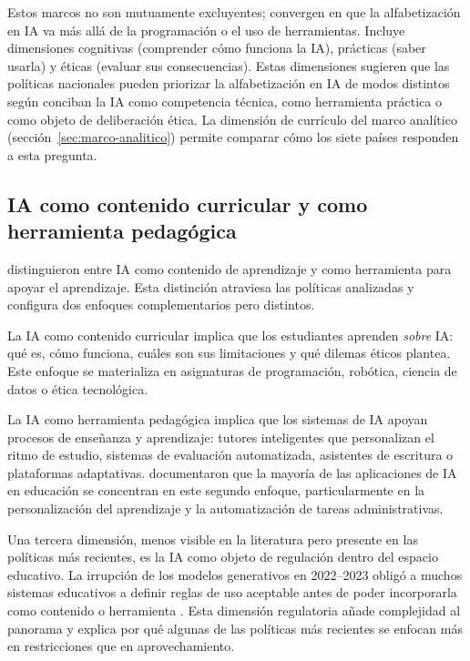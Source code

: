 Estos marcos no son mutuamente excluyentes; convergen en que la alfabetización en IA va más allá de la programación o el uso de herramientas. Incluye dimensiones cognitivas (comprender cómo funciona la IA), prácticas (saber usarla) y éticas (evaluar sus consecuencias). Estas dimensiones sugieren que las políticas nacionales pueden priorizar la alfabetización en IA de modos distintos según conciban la IA como competencia técnica, como herramienta práctica o como objeto de deliberación ética. La dimensión de currículo del marco analítico (sección~\ref{sec:marco-analitico}) permite comparar cómo los siete países responden a esta pregunta.


\subsection{IA como contenido curricular y como herramienta pedagógica}

\citet{holmes2019aied} distinguieron entre IA como contenido de aprendizaje y como herramienta para apoyar el aprendizaje. Esta distinción atraviesa las políticas analizadas y configura dos enfoques complementarios pero distintos.

La IA como contenido curricular implica que los estudiantes aprenden \emph{sobre} IA: qué es, cómo funciona, cuáles son sus limitaciones y qué dilemas éticos plantea. Este enfoque se materializa en asignaturas de programación, robótica, ciencia de datos o ética tecnológica.

La IA como herramienta pedagógica implica que los sistemas de IA apoyan procesos de enseñanza y aprendizaje: tutores inteligentes que personalizan el ritmo de estudio, sistemas de evaluación automatizada, asistentes de escritura o plataformas adaptativas. \citet{holmes2022state} documentaron que la mayoría de las aplicaciones de IA en educación se concentran en este segundo enfoque, particularmente en la personalización del aprendizaje y la automatización de tareas administrativas.

Una tercera dimensión, menos visible en la literatura pero presente en las políticas más recientes, es la IA como objeto de regulación dentro del espacio educativo. La irrupción de los modelos generativos en 2022--2023 obligó a muchos sistemas educativos a definir reglas de uso aceptable antes de poder incorporarla como contenido o herramienta \citep{unesco2023genai}. Esta dimensión regulatoria añade complejidad al panorama y explica por qué algunas de las políticas más recientes se enfocan más en restricciones que en aprovechamiento.

